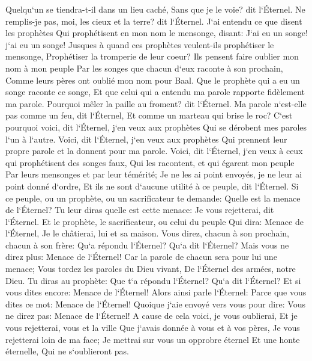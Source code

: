 \verse Quelqu`un se tiendra-t-il dans un lieu caché, Sans que je le voie? dit l`Éternel. Ne remplis-je pas, moi, les cieux et la terre? dit l`Éternel. 
\verse J`ai entendu ce que disent les prophètes Qui prophétisent en mon nom le mensonge, disant: J`ai eu un songe! j`ai eu un songe! 
\verse Jusques à quand ces prophètes veulent-ils prophétiser le mensonge, Prophétiser la tromperie de leur coeur? 
\verse Ils pensent faire oublier mon nom à mon peuple Par les songes que chacun d`eux raconte à son prochain, Comme leurs pères ont oublié mon nom pour Baal. 
\verse Que le prophète qui a eu un songe raconte ce songe, Et que celui qui a entendu ma parole rapporte fidèlement ma parole. Pourquoi mêler la paille au froment? dit l`Éternel. 
\verse Ma parole n`est-elle pas comme un feu, dit l`Éternel, Et comme un marteau qui brise le roc? 
\verse C`est pourquoi voici, dit l`Éternel, j`en veux aux prophètes Qui se dérobent mes paroles l`un à l`autre. 
\verse Voici, dit l`Éternel, j`en veux aux prophètes Qui prennent leur propre parole et la donnent pour ma parole. 
\verse Voici, dit l`Éternel, j`en veux à ceux qui prophétisent des songes faux, Qui les racontent, et qui égarent mon peuple Par leurs mensonges et par leur témérité; Je ne les ai point envoyés, je ne leur ai point donné d`ordre, Et ils ne sont d`aucune utilité à ce peuple, dit l`Éternel. 
\verse Si ce peuple, ou un prophète, ou un sacrificateur te demande: Quelle est la menace de l`Éternel? Tu leur diras quelle est cette menace: Je vous rejetterai, dit l`Éternel. 
\verse Et le prophète, le sacrificateur, ou celui du peuple Qui dira: Menace de l`Éternel, Je le châtierai, lui et sa maison. 
\verse Vous direz, chacun à son prochain, chacun à son frère: Qu`a répondu l`Éternel? Qu`a dit l`Éternel? 
\verse Mais vous ne direz plus: Menace de l`Éternel! Car la parole de chacun sera pour lui une menace; Vous tordez les paroles du Dieu vivant, De l`Éternel des armées, notre Dieu. 
\verse Tu diras au prophète: Que t`a répondu l`Éternel? Qu`a dit l`Éternel? 
\verse Et si vous dites encore: Menace de l`Éternel! Alors ainsi parle l`Éternel: Parce que vous dites ce mot: Menace de l`Éternel! Quoique j`aie envoyé vers vous pour dire: Vous ne direz pas: Menace de l`Éternel! 
\verse A cause de cela voici, je vous oublierai, Et je vous rejetterai, vous et la ville Que j`avais donnée à vous et à vos pères, Je vous rejetterai loin de ma face; 
\verse Je mettrai sur vous un opprobre éternel Et une honte éternelle, Qui ne s`oublieront pas. 


